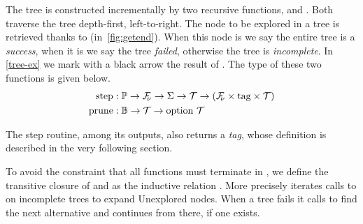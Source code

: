 
The tree is constructed incrementally by two recursive
functions, \step and \na. Both traverse the tree depth-first, left-to-right.
The node to be explored in a tree is retrieved thanks to \pathend (in~\cref{fig:getend}).
When this node is \okC we say the entire tree is a \emph{success}, when it
is \koC we say the tree \emph{failed}, otherwise the tree is \emph{incomplete}.
In \cref{tree-ex} we mark with a black arrow the result of \pathend.
The type of these two functions is given below.
%
\begin{align*}
  \mathrm{step}  & : \mathbb{P} \to \mathcal{F}_{\!\!\nu} \to \Sigma \to \mathcal{T} \to (\mathcal{F}_{\!\!\nu}\times\mathrm{tag}\times\mathcal{T})\\
  \mathrm{prune} & : \mathbb{B} \to \mathcal{T} \to \mathrm{option}\ \mathcal{T}
\end{align*}

The step routine, among its outputs, also returns a \emph{tag}, whose definition
is described in the very following section.

To avoid the constraint that all functions must terminate in \rocq, we define the transitive closure
of \step and \na as the inductive relation \runT.
More precisely \runT iterates calls to \step on incomplete trees to expand
Unexplored nodes. When a tree fails it calls \na to find
the next alternative and continues from there, if one exists.




